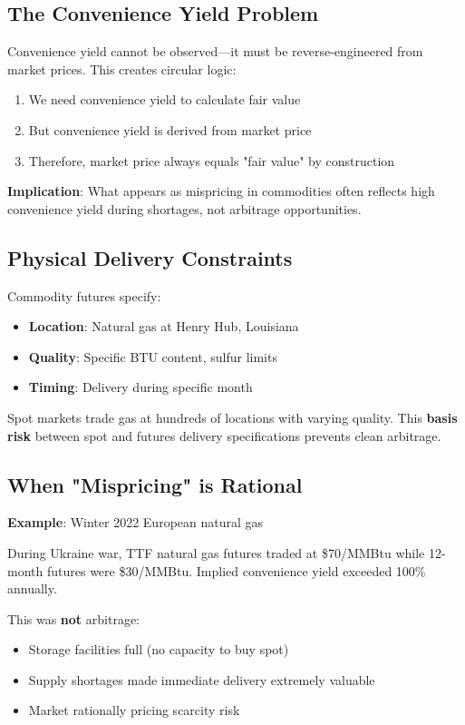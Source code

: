 \documentclass[12pt,a4paper]{article}
\begin{document}
\subsection{The Convenience Yield Problem}

Convenience yield cannot be observed—it must be reverse-engineered from market prices. This creates circular logic:

\begin{enumerate}
    \item We need convenience yield to calculate fair value
    \item But convenience yield is derived from market price
    \item Therefore, market price always equals "fair value" by construction
\end{enumerate}

\textbf{Implication}: What appears as mispricing in commodities often reflects high convenience yield during shortages, not arbitrage opportunities.

\subsection{Physical Delivery Constraints}

Commodity futures specify:
\begin{itemize}
    \item \textbf{Location}: Natural gas at Henry Hub, Louisiana
    \item \textbf{Quality}: Specific BTU content, sulfur limits
    \item \textbf{Timing}: Delivery during specific month
\end{itemize}

Spot markets trade gas at hundreds of locations with varying quality. This \textbf{basis risk} between spot and futures delivery specifications prevents clean arbitrage.

\subsection{When "Mispricing" is Rational}

\textbf{Example}: Winter 2022 European natural gas

During Ukraine war, TTF natural gas futures traded at \$70/MMBtu while 12-month futures were \$30/MMBtu. Implied convenience yield exceeded 100\% annually.

This was \textbf{not} arbitrage:
\begin{itemize}
    \item Storage facilities full (no capacity to buy spot)
    \item Supply shortages made immediate delivery extremely valuable
    \item Market rationally pricing scarcity risk
\end{itemize}
\end{document}
